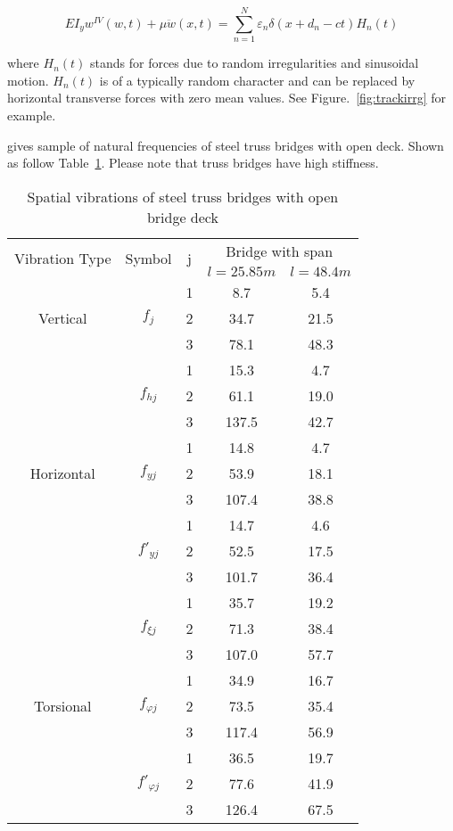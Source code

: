 \begin{equation}
	EI_yw^{IV}(w,t)+\mu \ddot{w} (x,t)=\sum_{n=1}^{N} \varepsilon_n\delta(x+d_n-ct)H_n(t) 
\end{equation}

where $ H_n(t) $ stands for forces due to random irregularities and sinusoidal motion. $ H_n(t) $ is of a typically random character and can be replaced by horizontal transverse forces with zero mean values. See Figure.~\ref{fig:trackirrg} for example.

\cite[Table 9.1]{fryba1996dynamics} gives sample of natural frequencies of steel truss bridges with open deck. Shown as follow Table~\ref{tab:spatialvibrationsteel}. Please note that truss bridges have high stiffness.

\begin{table}[h]
	\centering
	\begin{tabular}{ccccc}
		\hline
		\multirow{2}{*}{Vibration Type} & \multirow{2}{*}{Symbol} & \multirow{2}{*}{j} & \multicolumn{2}{c}{Bridge with span} \\
		\cline{4-5}
		 & & & $ l=25.85m $ & $ l=48.4m $\\
		\hline
		\multirow{3}{*}{Vertical} & \multirow{3}{*}{$ f_j $} & 1 & 8.7 & 5.4\\
		 & & 2 & 34.7 & 21.5 \\
	 	 & & 3 & 78.1 & 48.3 \\
	 	\hline
	 	\multirow{9}{*}{Horizontal} & \multirow{3}{*}{$ f_{hj} $} & 1 & 15.3 & 4.7 \\
	 	 & & 2 & 61.1 & 19.0 \\
	 	 & & 3 & 137.5 & 42.7 \\
	 	\cline{2-5}
	 	 & \multirow{3}{*}{$ f_{yj} $} & 1 & 14.8 & 4.7 \\
	 	 & & 2 & 53.9 & 18.1 \\
	 	 & & 3 & 107.4 & 38.8 \\ 
	 	\cline{2-5}
	 	 & \multirow{3}{*}{$ {f}'_{yj} $} & 1 & 14.7 & 4.6 \\
	 	 & & 2 & 52.5 & 17.5 \\
	 	 & & 3 & 101.7 & 36.4 \\ 
	 	\cline{2-5}
	 	\hline
	 	\multirow{9}{*}{Torsional} & \multirow{3}{*}{$ f_{\xi j} $} & 1 & 35.7 & 19.2 \\
	 	 & & 2 & 71.3 & 38.4 \\
	 	 & & 3 & 107.0 & 57.7 \\
	 	\cline{2-5}
	 	 & \multirow{3}{*}{$ f_{\varphi j} $} & 1 & 34.9 & 16.7 \\
	 	 & & 2 & 73.5 & 35.4 \\
	 	 & & 3 & 117.4 & 56.9 \\ 
	 	\cline{2-5}
	 	 & \multirow{3}{*}{$ {f}'_{\varphi j} $} & 1 & 36.5 & 19.7 \\
	 	 & & 2 & 77.6 & 41.9 \\
	 	 & & 3 & 126.4 & 67.5 \\ 
	 	\hline
	\end{tabular}
	\caption{Spatial vibrations of steel truss bridges with open bridge deck}
	\label{tab:spatialvibrationsteel}
\end{table}


